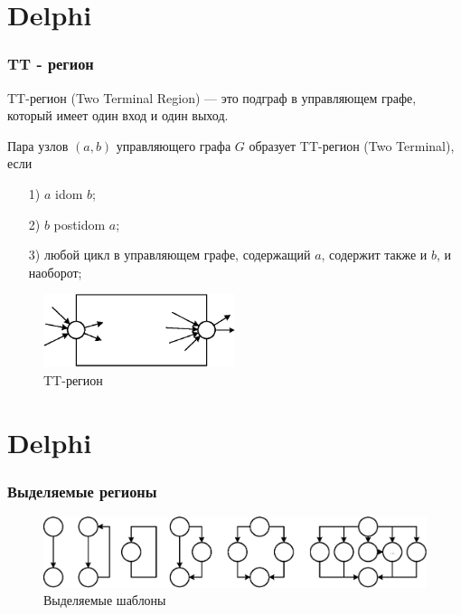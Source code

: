 \documentclass{beamer}
\begin{document}
\section{Delphi}
\begin{frame}
\frametitle{TT - регион}

\scriptsize{
\newtheorem{TT}{Определение}[section]
\begin{Def}
	TT-регион (Two Terminal Region) --- это подграф в управляющем графе, который имеет один вход и один выход.
\end{Def}

\newtheorem{TTreg}{Определение}[section]
\begin{Def}
	Пара узлов $(a, b)$ управляющего графа $G$ образует TT-регион (Two Terminal), если
	\begin{enumerate}
		\item[1)]
			$a$ idom $b$;
		\item[2)]
			$b$ postidom $a$;
		\item[3)]
			любой цикл в управляющем графе, содержащий $a$, содержит также и $b$, и наоборот;
	\end{enumerate}
\end{Def}


\begin{figure}[htbp]
	\centering
		\includegraphics[width=0.5\textwidth]{Pic/TTRegion.eps}
	\caption{TT-регион}
	\label{fig:TTRegion}
\end{figure}
}

\end{frame}


\section{Delphi}
\begin{frame}
\frametitle{Выделяемые регионы}
\begin{figure}[htbp]
	\centering
		\includegraphics[width=1\textwidth]{Pic/Reg.eps}
	\caption{Выделяемые шаблоны}
	\label{fig:Regions}
\end{figure}
\end{frame}
\end{document}

